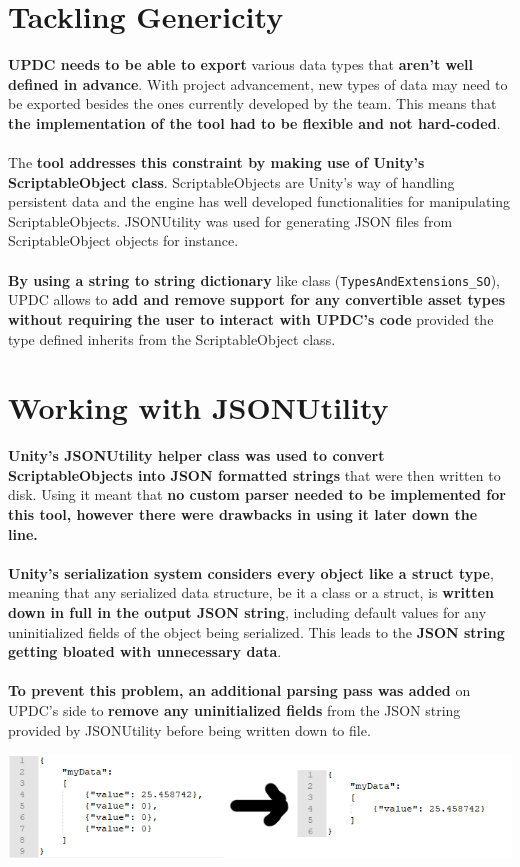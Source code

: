 \documentclass[12pt,a4paper]{article}
\begin{document}
\section{Tackling Genericity}
\textbf{UPDC needs to be able to export} various data types that \textbf{aren't well defined in advance}. With project advancement, new types of data may need to be exported besides the ones currently developed by the team. This means that \textbf{the implementation of the tool had to be flexible and not hard-coded}.\\\\
The \textbf{tool addresses this constraint by making use of Unity's ScriptableObject class}. ScriptableObjects are Unity's way of handling persistent data and the engine has well developed functionalities for manipulating ScriptableObjects. JSONUtility was used for generating JSON files from ScriptableObject objects for instance.\\\\
\textbf{By using a string to string dictionary} like class (\texttt{TypesAndExtensions\_SO}), UPDC allows to \textbf{add and remove support for any convertible asset types without requiring the user to interact with UPDC's code} provided the type defined inherits from the ScriptableObject class.

\section{Working with JSONUtility}
\textbf{Unity's JSONUtility helper class was used to convert ScriptableObjects into JSON formatted strings} that were then written to disk. Using it meant that \textbf{no custom parser needed to be implemented for this tool, however there were drawbacks in using it later down the line.}\\\\
\textbf{Unity's serialization system considers every object like a struct type}, meaning that any serialized data structure, be it a class or a struct, is \textbf{written down in full in the output JSON string}, including default values for any uninitialized fields of the object being serialized. This leads to the \textbf{JSON string getting bloated with unnecessary data}.\\\\
\textbf{To prevent this problem, an additional parsing pass was added} on UPDC's side to \textbf{remove any uninitialized fields} from the JSON string provided by JSONUtility before being written down to file.
\begin{center}
\includegraphics[scale=1.0]{cleaningJson}
\end{center}
\end{document}
